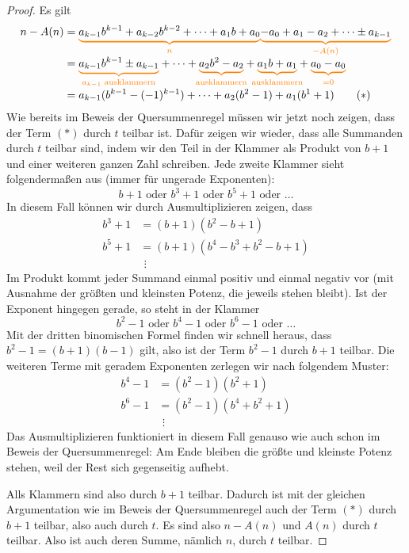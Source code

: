 \documentclass[../../main.tex]{subfiles}
\begin{document}
\begin{proof}
    Es gilt
    \begin{align*}
        n-A(n)&=\colorbrace{a_{k-1}b^{k-1}+a_{k-2}b^{k-2}+\cdots+a_1b+a_0}{n}\colorbrace{-a_0+a_1-a_2+\cdots\pm a_{k-1}}{-A(n)}\\
        &=\colorbrace{a_{k-1}b^{k-1}\pm a_{k-1}}{a_{k-1}\text{ ausklammern}}+\dots+\colorbrace{a_2b^2-a_2}{\text{ausklammern}}+\colorbrace{a_1b+a_1}{\text{ausklammern}}+\colorbrace{a_0-a_0}{=0}\\
        &=a_{k-1}(b^{k-1}-(-1)^{k-1})+\dots+a_2(b^2-1)+a_1(b^1+1)\tag{$*$}
    \end{align*}
    Wie bereits im Beweis der Quersummenregel müssen wir jetzt noch zeigen, dass der Term $(*)$ durch $t$ teilbar ist.
    Dafür zeigen wir wieder, dass alle Summanden durch $t$ teilbar sind, indem wir den Teil in der Klammer als Produkt
    von $b+1$ und einer weiteren ganzen Zahl schreiben. Jede zweite Klammer sieht folgendermaßen aus (immer für ungerade
    Exponenten):
    \[b+1\text{ oder }b^3+1\text{ oder }b^5+1\text{ oder }\dots\]
    In diesem Fall können wir durch Ausmultiplizieren zeigen, dass 
    \begin{align*}
        b^3+1&=(b+1)(b^2-b+1)\\
        b^5+1&=(b+1)(b^4-b^3+b^2-b+1)\\
        &~\,\vdots
    \end{align*}
    Im Produkt kommt jeder Summand einmal positiv und einmal negativ vor (mit Ausnahme der größten und kleinsten Potenz,
    die jeweils stehen bleibt). Ist der Exponent hingegen gerade, so steht in der Klammer
    \[b^2-1\text{ oder }b^4-1\text{ oder }b^6-1\text{ oder }\dots\]
    Mit der dritten binomischen Formel finden wir schnell heraus, dass $b^2-1=(b+1)(b-1)$ gilt, also ist der Term
    $b^2-1$ durch $b+1$ teilbar. Die weiteren Terme mit geradem Exponenten zerlegen wir nach folgendem Muster:
    \begin{align*}
        b^4-1&=(b^2-1)(b^2+1)\\
        b^6-1&=(b^2-1)(b^4+b^2+1)\\
        &~\,\vdots
    \end{align*}
    Das Ausmultiplizieren funktioniert in diesem Fall genauso wie auch schon im Beweis der Quersummenregel: Am Ende
    bleiben die größte und kleinste Potenz stehen, weil der Rest sich gegenseitig aufhebt.

    Alls Klammern sind also durch $b+1$ teilbar. Dadurch ist mit der gleichen Argumentation wie im Beweis der
    Quersummenregel auch der Term $(*)$ durch $b+1$ teilbar, also auch durch $t$. Es sind also $n-A(n)$ und $A(n)$ durch
    $t$ teilbar. Also ist auch deren Summe, nämlich $n$, durch $t$ teilbar.
\end{proof}
\end{document}
